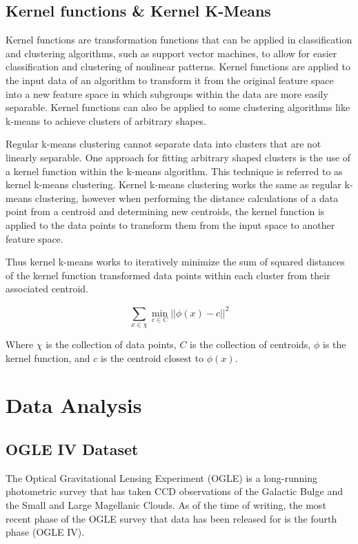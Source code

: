 \documentclass[]{article}
\begin{document}
\subsection{Kernel functions \& Kernel K-Means}

Kernel functions are transformation functions that can be applied in classification and clustering algorithms, such as support vector machines, to allow for easier classification and clustering of nonlinear patterns. Kernel functions are applied to the input data of an algorithm to transform it from the original feature space into a new feature space in which subgroups within the data are more easily separable. \cite{amari_1999} Kernel functions can also be applied to some clustering algorithms like k-means to achieve clusters of arbitrary shapes. \cite{scholkopf_1998, jain_2010}

Regular k-means clustering cannot separate data into clusters that are not linearly separable. One approach for fitting arbitrary shaped clusters is the use of a kernel function within the k-means algorithm. This technique is referred to as kernel k-means clustering. Kernel k-means clustering works the same as regular k-means clustering, however when performing the distance calculations of a data point from a centroid and determining new centroids, the kernel function is applied to the data points to transform them from the input space to another feature space. \cite{dhillon_2004}

Thus kernel k-means works to iteratively minimize the sum of squared distances of the kernel function transformed data points within each cluster from their associated centroid.

$$
\sum_{x \in \chi}^{}\min_{c \in C} || \phi(x) - c ||^2
$$

Where $\chi$ is the collection of data points, $C$ is the collection of centroids, $\phi$ is the kernel function, and $c$ is the centroid closest to $\phi(x)$.


\newpage

\section{Data Analysis}

\subsection{OGLE IV Dataset}

The Optical Gravitational Lensing Experiment (OGLE) is a long-running photometric survey that has taken CCD observations of the Galactic Bulge and the Small and Large Magellanic Clouds. \cite{udalski_1992, soszynski_2016} As of the time of writing, the most recent phase of the OGLE survey that data has been released for is the fourth phase (OGLE IV). \cite{soszynski_2016}
\end{document}
